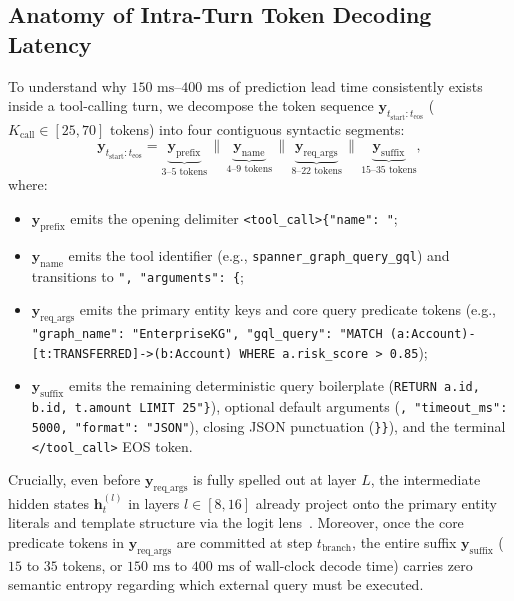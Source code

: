 \documentclass[10pt,conference]{IEEEtran}
\begin{document}
\subsection{Anatomy of Intra-Turn Token Decoding Latency}
To understand why $150\text{ ms}$--$400\text{ ms}$ of prediction lead time consistently exists inside a tool-calling turn, we decompose the token sequence $\mathbf{y}_{t_{\text{start}} : t_{\text{eos}}}$ ($K_{\text{call}} \in [25, 70]$ tokens) into four contiguous syntactic segments:
\begin{equation}
\mathbf{y}_{t_{\text{start}} : t_{\text{eos}}} = \underbrace{\mathbf{y}_{\text{prefix}}}_{\text{3--5 tokens}} \,\parallel\, \underbrace{\mathbf{y}_{\text{name}}}_{\text{4--9 tokens}} \,\parallel\, \underbrace{\mathbf{y}_{\text{req\_args}}}_{\text{8--22 tokens}} \,\parallel\, \underbrace{\mathbf{y}_{\text{suffix}}}_{\text{15--35 tokens}},
\label{eq:token_decomposition}
\end{equation}
where:
\begin{itemize}
    \item $\mathbf{y}_{\text{prefix}}$ emits the opening delimiter \texttt{<tool\_call>\{"name": "};
    \item $\mathbf{y}_{\text{name}}$ emits the tool identifier (e.g., \texttt{spanner\_graph\_query\_gql}) and transitions to \texttt{", "arguments": \{};
    \item $\mathbf{y}_{\text{req\_args}}$ emits the primary entity keys and core query predicate tokens (e.g., \texttt{"graph\_name": "EnterpriseKG", "gql\_query": "MATCH (a:Account)\allowbreak-[t:TRANSFERRED]->\allowbreak(b:Account) WHERE a.risk\_score > 0.85});
    \item $\mathbf{y}_{\text{suffix}}$ emits the remaining deterministic query boilerplate (\texttt{RETURN a.id, b.id, t.amount LIMIT 25"\}}), optional default arguments (\texttt{, "timeout\_ms": 5000, "format": "JSON"}), closing JSON punctuation (\texttt{\}\}}), and the terminal \texttt{</tool\_call>} EOS token.
\end{itemize}

Crucially, even before $\mathbf{y}_{\text{req\_args}}$ is fully spelled out at layer $L$, the intermediate hidden states $\mathbf{h}_t^{(l)}$ in layers $l \in [8, 16]$ already project onto the primary entity literals and template structure via the logit lens~\cite{nostalgebraist2020logitlens, belrose2023eliciting}. Moreover, once the core predicate tokens in $\mathbf{y}_{\text{req\_args}}$ are committed at step $t_{\text{branch}}$, the entire suffix $\mathbf{y}_{\text{suffix}}$ ($15$ to $35$ tokens, or $150\text{ ms}$ to $400\text{ ms}$ of wall-clock decode time) carries zero semantic entropy regarding which external query must be executed.
\end{document}

